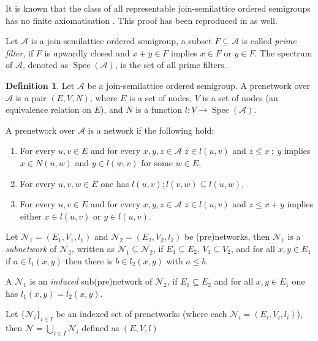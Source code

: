 \documentclass[a4paper]{article}
\theoremstyle{definition}
\newtheorem{definition}{Definition}
\theoremstyle{theorem}
\theoremstyle{proposition}
\theoremstyle{lemma}
\theoremstyle{ex}
\theoremstyle{corollary}
\theoremstyle{claim}
\begin{document}
It is known that the class of all representable join-semilattice ordered semigroups has no finite axiomatisation \cite{andreka1989union}. This proof has been reproduced in \cite{andreka2011axiomatizability} as well.

Let $\mathcal{A}$ is a join-semilattice ordered semigroup, a subset $F \subseteq \mathcal{A}$ is called \emph{prime filter}, if $F$ is upwardly closed and $x + y \in F$ implies $x \in F$ or $y \in F$. The spectrum of $\mathcal{A}$, denoted as $\operatorname{Spec}(\mathcal{A})$, is the set of all prime filters.

\begin{definition} Let $\mathcal{A}$ be a join-semilattice ordered semigroup. A prenetwork over $\mathcal{A}$ is a pair $(E, V, N)$, where $E$ is a set of nodes, $V$ is a set of nodes (an equivalence relation on $E$), and $N$ is a function $l : V \to \operatorname{Spec}(\mathcal{A})$.

  A prenetwork over $\mathcal{A}$ is a network if the following hold:
  \begin{enumerate}
    \item For every $u, v \in E$ and for every $x,y,z \in \mathcal{A}$ $z \in l(u, v)$ and $z \leq x \: ; \: y$ implies $x \in N(u, w)$ and $y \in l(w, v)$ for some $w \in E$,
    \item For every $u, v, w \in E$ one has $l(u, v) ; l(v, w) \subseteq l(u, w)$,
    \item For every $u, v \in E$ and for every $x,y,z \in \mathcal{A}$ $z \in l(u, v)$ and $z \leq x + y$ implies either $x \in l(u, v)$ or $y \in l(u, v)$.
  \end{enumerate}
\end{definition}

Let $\mathcal{N}_1 = (E_1, V_1, l_1)$ and $\mathcal{N}_2 = (E_2, V_2, l_2)$ be (pre)networks, then $\mathcal{N}_1$ is a \emph{subnetwork} of $\mathcal{N}_2$, written as $\mathcal{N}_1 \subseteq \mathcal{N}_2$,
if $E_1 \subseteq E_2$, $V_1 \subseteq V_2$, and for all $x, y \in E_1$ if $a \in l_1(x, y)$ then there is $b \in l_2(x, y)$ with $a \leq b$.

A $\mathcal{N}_1$ is an \emph{induced} sub(pre)network of $\mathcal{N}_2$, if $E_1 \subseteq E_2$ and for all $x, y \in E_1$ one has $l_1(x,y) = l_2(x,y)$.

Let $\{ \mathcal{N}_i \}_{i \in I}$ be an indexed set of prenetworks (where each $\mathcal{N}_i = (E_i, V_i, l_i)$), then $\mathcal{N} = \bigcup \limits_{i \in I} \mathcal{N}_i$ defined as $(E, V, l)$
\end{document}
